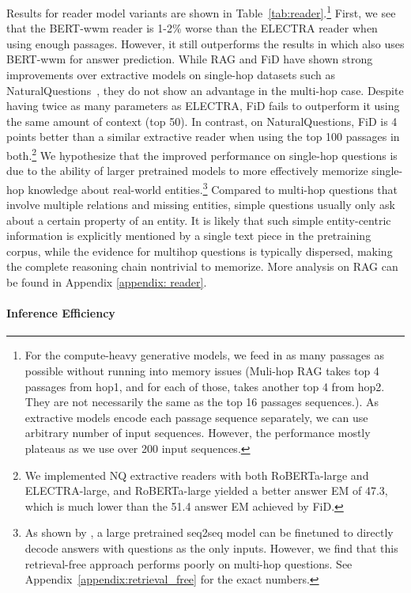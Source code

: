 Results for reader model variants are shown in Table~\ref{tab:reader}.\footnote{For the compute-heavy generative models, we feed in as many passages as possible without running into memory issues (Muli-hop RAG takes top 4 passages from hop1, and for each of those, takes another top 4 from hop2. They are not necessarily the same as the top 16 passages sequences.). As extractive models encode each passage sequence separately, we can use arbitrary number of input sequences. However, the performance mostly plateaus as we use over 200 input sequences.}
First, we see that the BERT-wwm reader is 1-2\% worse than the ELECTRA reader when using enough passages. However, it still outperforms the results in \citep{GraphRecurrentRetriever} which also uses BERT-wwm for answer prediction.
While RAG and FiD have shown strong improvements over extractive models on single-hop datasets such as NaturalQuestions~\citep{NQ}, they do not show an advantage in the multi-hop case. Despite having twice as many parameters as ELECTRA, FiD fails to outperform it using the same amount of context (top 50). 
In contrast, on NaturalQuestions, FiD is 4 points better than a similar extractive reader when using the top 100 passages in both.\footnote{We implemented NQ extractive readers with both RoBERTa-large and ELECTRA-large, and RoBERTa-large yielded a better answer EM of 47.3, which is much lower than the 51.4 answer EM achieved by FiD.}
We hypothesize that the improved performance on single-hop questions is due to the ability of larger pretrained models to more effectively memorize single-hop knowledge about real-world entities.\footnote{As shown by \citet{t5close}, a large pretrained seq2seq model can be finetuned to directly decode answers with questions as the only inputs. However, we find that this retrieval-free approach performs poorly on multi-hop questions. See Appendix~\ref{appendix:retrieval_free} for the exact numbers.}
Compared to multi-hop questions that involve multiple relations and missing entities, simple questions usually only ask about a certain property of an entity. It is likely that such simple entity-centric information is explicitly mentioned by a single text piece in the pretraining corpus, while the evidence for multihop questions is typically dispersed, making the complete reasoning chain nontrivial to memorize. More analysis on RAG can be found in Appendix \ref{appendix: reader}.

    

\paragraph{Inference Efficiency}
\label{sec:qa_analysis}

